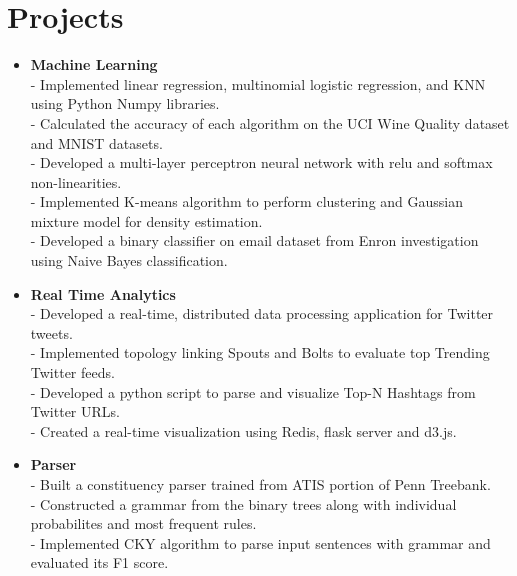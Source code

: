 \section {Projects}
\begin{itemize}


 \item \textbf{Machine Learning} \\
 - Implemented linear regression, multinomial logistic regression, and KNN using Python Numpy libraries. \\
 - Calculated the accuracy of each algorithm on the UCI Wine Quality dataset and MNIST datasets.\\
 - Developed a multi-layer perceptron neural network with relu and softmax non-linearities. \\
 - Implemented K-means algorithm to perform clustering and Gaussian mixture model for density estimation.\\
 - Developed a binary classifier on email dataset from Enron investigation using Naive Bayes classification.

\item \textbf{Real Time Analytics} \\
 - Developed a real-time, distributed data processing application for Twitter tweets.\\
 - Implemented topology linking Spouts and Bolts to evaluate top Trending Twitter feeds. \\
 - Developed a python script to parse and visualize Top-N Hashtags from Twitter URLs.\\
 - Created a real-time visualization using Redis, flask server and d3.js.
 
  \item \textbf{Parser} \\
 - Built a constituency parser trained from ATIS portion of Penn Treebank.\\
 - Constructed a grammar from the binary trees along with individual probabilites and most frequent rules. \\
 - Implemented CKY algorithm to parse input sentences with grammar and evaluated its F1 score.



\end{itemize}

